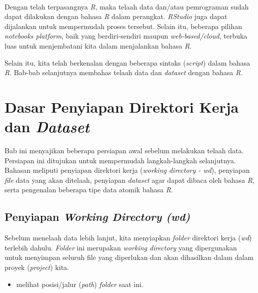 \documentclass[
  12pt,
  a4paper,
]{scrbook}
\providecommand{\tightlist}{%
  \setlength{\itemsep}{0pt}\setlength{\parskip}{0pt}}
\begin{document}
~

Dengan telah terpasangnya \emph{R}, maka telaah data dan/atau
pemrograman sudah dapat dilakukan dengan bahasa \emph{R} dalam
perangkat. \emph{RStudio} juga dapat dijalankan untuk mempermudah proses
tersebut. Selain itu, beberapa pilihan \emph{notebooks platform}, baik
yang berdiri-sendiri maupun \emph{web-based/cloud}, terbuka luas untuk
menjembatani kita dalam menjalankan bahasa \emph{R}.

Selain itu, kita telah berkenalan dengan beberapa sintaks
(\emph{script}) dalam bahasa \emph{R}. Bab-bab selanjutnya membahas
telaah data dan \emph{dataset} dengan bahasa \emph{R}.

\newpage

\hypertarget{dasar-penyiapan-direktori-kerja-dan-dataset}{%
\chapter{\texorpdfstring{Dasar Penyiapan Direktori Kerja dan
\emph{Dataset}}{Dasar Penyiapan Direktori Kerja dan Dataset}}\label{dasar-penyiapan-direktori-kerja-dan-dataset}}

Bab ini menyajikan beberapa persiapan awal sebelum melakukan telaah
data. Persiapan ini ditujukan untuk mempermudah langkah-langkah
selanjutnya. Bahasan meliputi penyiapan direktori kerja (\emph{working
directory - wd}), penyiapan \emph{file} data yang akan ditelaah,
penyiapan \emph{dataset} agar dapat dibaca oleh bahasa \emph{R}, serta
pengenalan beberapa tipe data atomik bahasa \emph{R}.

\hypertarget{penyiapan-working-directory-wd}{%
\section{\texorpdfstring{Penyiapan \emph{Working Directory
(wd)}}{Penyiapan Working Directory (wd)}}\label{penyiapan-working-directory-wd}}

Sebelum menelaah data lebih lanjut, kita menyiapkan \emph{folder}
direktori kerja (\emph{wd}) terlebih dahulu. \emph{Folder} ini merupakan
\emph{working directory} yang dipergunakan untuk menyimpan seluruh file
yang diperlukan dan akan dihasilkan dalam dalam proyek (\emph{project})
kita.

\begin{itemize}
\tightlist
\item
  melihat posisi/jalur (\emph{path}) \emph{folder} saat ini.
\end{itemize}
\end{document}
